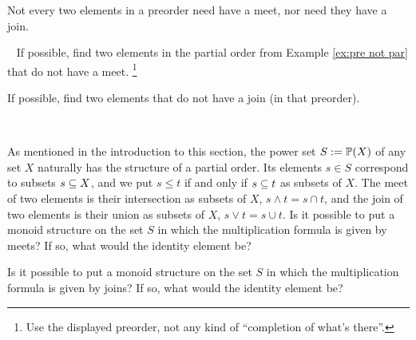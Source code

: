\begin{exerciseRUS}
\end{exerciseRUS}

\begin{blockENG}
Not every two elements in a preorder need have a meet, nor need they have a join. 
\end{blockENG}

\begin{blockRUS}
\end{blockRUS}

\begin{exerciseENG}\label{exc:not all meets and joins}~
\sexc If possible, find two elements in the partial order from Example \ref{ex:pre not par} that do not have a meet.
\footnote{Use the displayed preorder, not any kind of “completion of what's there”.} 
\item If possible, find two elements that do not have a join (in that preorder).
\endsexc
\end{exerciseENG}

\begin{exerciseRUS}\label{exc:not all meets and joins}~
\end{exerciseRUS}

\begin{exerciseENG}
As mentioned in the introduction to this section, the power set $S:=\PP(X)$ of any set $X$ naturally has the structure of a partial order. Its elements $s\in S$ correspond to subsets $s\ss X$, and we put $s\leq t$ if and only if $s\ss t$ as subsets of $X$. The meet of two elements is their intersection as subsets of $X$, $s\wedge t= s\cap t$, and the join of two elements is their union as subsets of $X$, $s\vee t=s\cup t$.
\sexc Is it possible to put a monoid structure on the set $S$ in which the multiplication formula is given by meets? If so, what would the identity element be?
\item Is it possible to put a monoid structure on the set $S$ in which the multiplication formula is given by joins? If so, what would the identity element be?
\endsexc
\end{exerciseENG}

\begin{exerciseRUS}
\end{exerciseRUS}

